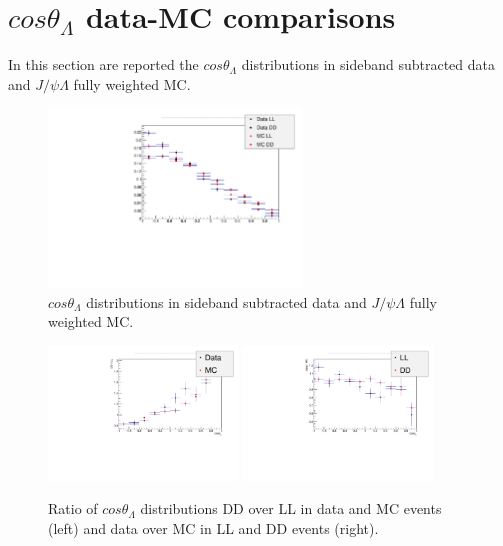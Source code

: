 \section{$cos \theta_\Lambda$ data-MC comparisons}

In this section are reported the $cos \theta_\Lambda$ distributions in sideband subtracted data and $J/\psi\Lambda$ fully weighted MC.


\begin{figure}[h!]
\centering
\includegraphics[width=0.6\textwidth]{Lmumu/figs/costhetaB_distribs.pdf} 
\caption{$cos \theta_\Lambda$ distributions in sideband subtracted data and $J/\psi\Lambda$ fully weighted MC.}
\end{figure}

\begin{figure}[h!]
\centering
\includegraphics[width=0.45\textwidth]{Lmumu/figs/DD_Over_LL_MC_And_Data_cosThetaB.pdf}
\includegraphics[width=0.45\textwidth]{Lmumu/figs/Data_Over_MC_DD_And_LL_cosThetaB.pdf}
\caption{Ratio of $cos \theta_\Lambda$ distributions DD over LL in data and MC events (left) and data over MC in LL and DD events (right).}
\end{figure}

